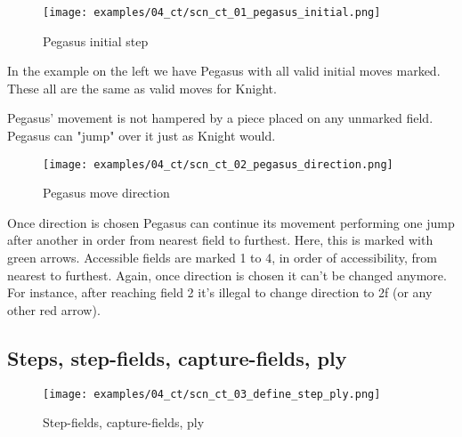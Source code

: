 \noindent
\begin{wrapfigure}[15]{l}{0.5\textwidth}
\centering
\texttt{[image: examples/04\_ct/scn\_ct\_01\_pegasus\_initial.png]}
\caption{Pegasus initial step}
\label{fig:scn_ct_01_pegasus_initial}
\end{wrapfigure}
In the example on the left we have Pegasus with all valid initial moves marked.
These all are the same as valid moves for Knight.

Pegasus' movement is not hampered by a piece placed on any unmarked field.
Pegasus can "jump" over it just as Knight would.

\clearpage %

\noindent
\begin{figure}[!h]
\texttt{[image: examples/04\_ct/scn\_ct\_02\_pegasus\_direction.png]}
\caption{Pegasus move direction}
\label{fig:scn_ct_02_pegasus_direction}
\end{figure}

Once direction is chosen Pegasus can continue its movement performing one jump
after another in order from nearest field to furthest. Here, this is marked
with green arrows. Accessible fields are marked 1 to 4, in order of accessibility,
from nearest to furthest. Again, once direction is chosen it can't be changed anymore.
For instance, after reaching field 2 it's illegal to change direction to 2f (or
any other red arrow).

\clearpage %

\subsection*{Steps, step-fields, capture-fields, ply}

\noindent
\begin{figure}[!h]
\vspace{-1.0\baselineskip}
\texttt{[image: examples/04\_ct/scn\_ct\_03\_define\_step\_ply.png]}
\caption{Step-fields, capture-fields, ply}
\label{fig:scn_ct_03_define_step_ply}
\end{figure}

